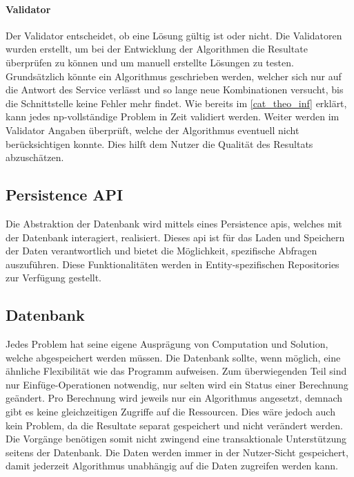 \paragraph{Validator}
Der Validator entscheidet, ob eine Lösung gültig ist oder nicht. Die Validatoren wurden erstellt, um bei der Entwicklung der Algorithmen die Resultate überprüfen zu können und um manuell 
erstellte Lösungen zu testen. Grundsätzlich könnte ein Algorithmus geschrieben werden, welcher sich nur auf die Antwort des Service verlässt und so lange neue Kombinationen versucht, 
bis die Schnittstelle keine Fehler mehr findet. Wie bereits im \autoref{cat_theo_inf} erklärt, kann jedes \gls{np}-vollständige Problem in  Zeit validiert 
werden. Weiter werden im Validator Angaben überprüft, welche der Algorithmus eventuell nicht berücksichtigen konnte. Dies hilft dem Nutzer die Qualität des Resultats abzuschätzen.

\subsection{Persistence API}
Die Abstraktion der Datenbank wird mittels eines Persistence \glspl{api}, welches mit der Datenbank interagiert, realisiert. Dieses \gls{api} ist für das Laden und Speichern der Daten 
verantwortlich und bietet die Möglichkeit, spezifische Abfragen auszuführen. Diese Funktionalitäten werden in Entity-spezifischen Repositories zur Verfügung gestellt.

\subsection{Datenbank}
Jedes Problem hat seine eigene Ausprägung von Computation und Solution, welche abgespeichert werden müssen. Die Datenbank sollte, wenn möglich, eine ähnliche Flexibilität wie 
das Programm aufweisen. Zum überwiegenden Teil sind nur Einfüge-Operationen notwendig, nur selten wird ein Status einer Berechnung geändert. Pro Berechnung wird jeweils nur ein 
Algorithmus angesetzt, demnach gibt es keine gleichzeitigen Zugriffe auf die Ressourcen. Dies wäre jedoch auch kein Problem, da die Resultate separat gespeichert und nicht verändert 
werden. Die Vorgänge benötigen somit nicht zwingend eine transaktionale Unterstützung seitens der Datenbank. Die Daten werden immer in der Nutzer-Sicht gespeichert, damit jederzeit 
Algorithmus unabhängig auf die Daten zugreifen werden kann.

